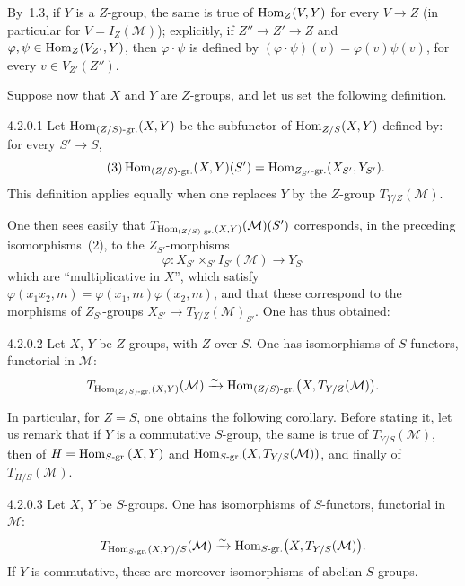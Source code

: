 By~1.3, if \(Y\) is a \(Z\)-group, the same is true of \(\operatorname{Hom}_{Z}(V,Y)\) for
every \(V\to Z\) (in particular for \(V=I_{Z}(\mathcal{M})\)); explicitly, if
\(Z''\to Z'\to Z\) and \(\varphi,\psi\in\operatorname{Hom}_{Z}(V_{Z'},Y)\), then
\(\varphi\cdot\psi\) is defined by \((\varphi\cdot\psi)(v)=\varphi(v)\psi(v)\),
for every \(v\in V_{Z'}(Z'')\).

Suppose now that \(X\) and \(Y\) are \(Z\)-groups, and let us set the following
definition.

\begin{definition}{4.2.0.1}\label{II.4.2.0.1}
Let \(\operatorname{Hom}_{(Z/S)\text{-gr.}}(X,Y)\) be the subfunctor of
\(\operatorname{Hom}_{Z/S}(X,Y)\) defined by: for every \(S'\to S\),
\begin{equation}
\tag{3}
\operatorname{Hom}_{(Z/S)\text{-gr.}}(X,Y)(S')
=
\operatorname{Hom}_{Z_{S'}\text{-gr.}}(X_{S'},Y_{S'}).
\end{equation}
This definition applies equally when one replaces \(Y\) by the \(Z\)-group
\(T_{Y/Z}(\mathcal{M})\).
\end{definition}

One then sees easily that
\(T_{\operatorname{Hom}_{(Z/S)\text{-gr.}}(X,Y)}(\mathcal{M})(S')\) corresponds, in the
preceding isomorphisms~(2), to the \(Z_{S'}\)-morphisms
\[
\varphi\colon X_{S'}\times_{S'}I_{S'}(\mathcal{M})\longrightarrow Y_{S'}
\]
which are ``multiplicative in \(X\)'', \ie which satisfy
\(\varphi(x_{1}x_{2},m)=\varphi(x_{1},m)\varphi(x_{2},m)\), and that these
correspond to the morphisms of \(Z_{S'}\)-groups
\(X_{S'}\to T_{Y/Z}(\mathcal{M})_{S'}\). One has thus obtained:

\begin{proposition}{4.2.0.2}\label{II.4.2.0.2}
Let \(X\), \(Y\) be \(Z\)-groups, with \(Z\) over \(S\). One has isomorphisms
of \(S\)-functors, functorial in \(\mathcal{M}\):
\[
T_{\operatorname{Hom}_{(Z/S)\text{-gr.}}(X,Y)}(\mathcal{M})
\xrightarrow{\sim}
\operatorname{Hom}_{(Z/S)\text{-gr.}}\bigl(X,T_{Y/Z}(\mathcal{M})\bigr).
\]
\end{proposition}

In particular, for \(Z=S\), one obtains the following corollary. Before
stating it, let us remark that if \(Y\) is a commutative \(S\)-group, the
same is true of \(T_{Y/S}(\mathcal{M})\), then of
\(H=\operatorname{Hom}_{S\text{-gr.}}(X,Y)\) and
\(\operatorname{Hom}_{S\text{-gr.}}(X,T_{Y/S}(\mathcal{M}))\), and finally of
\(T_{H/S}(\mathcal{M})\).

\begin{corollary}{4.2.0.3}\label{II.4.2.0.3}
Let \(X\), \(Y\) be \(S\)-groups. One has isomorphisms of \(S\)-functors,
functorial in \(\mathcal{M}\):
\[
T_{\operatorname{Hom}_{S\text{-gr.}}(X,Y)/S}(\mathcal{M})
\xrightarrow{\sim}
\operatorname{Hom}_{S\text{-gr.}}\bigl(X,T_{Y/S}(\mathcal{M})\bigr).
\]
If \(Y\) is commutative, these are moreover isomorphisms of abelian
\(S\)-groups.
\end{corollary}

